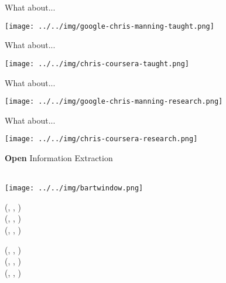\def\title{What about...}
\begin{frame}{\title}
\begin{center}
  \texttt{[image: ../../img/google-chris-manning-taught.png]}
\end{center}
\end{frame}
\begin{frame}[noframenumbering]{\title}
\begin{center}
  \texttt{[image: ../../img/chris-coursera-taught.png]} \\
\end{center}
\end{frame}
\begin{frame}[noframenumbering]{\title}
\begin{center}
  \texttt{[image: ../../img/google-chris-manning-research.png]}
\end{center}
\end{frame}
\begin{frame}[noframenumbering]{\title}
\begin{center}
  \texttt{[image: ../../img/chris-coursera-research.png]} \\
\end{center}
\end{frame}

\def\title{\textbf{Open} Information Extraction}
\begin{frame}{\title}
\begin{center}
   \\
  \vspace{0.5em}
  \texttt{[image: ../../img/bartwindow.png]} \\
\end{center}
\vspace{0.5em}
\pause

(, , ) \\
(, , ) \\
(, , )
\pause

(, , ) \\
(, , ) \\
(, , ) \\
\vspace{1em}
%
\end{frame}

